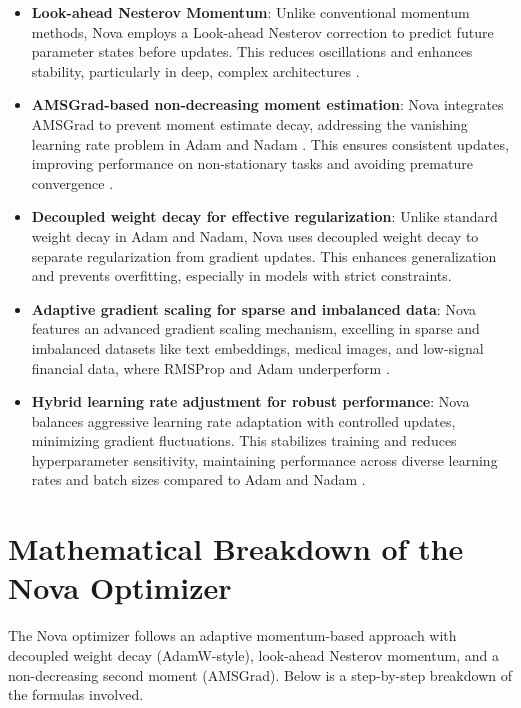 \documentclass{article}
\begin{document}
\begin{itemize}
\item \textbf{Look-ahead Nesterov Momentum}: Unlike conventional momentum methods, Nova employs a Look-ahead Nesterov correction \cite{nesterov1983method, B4} to predict future parameter states before updates. This reduces oscillations and enhances stability, particularly in deep, complex architectures \cite{Goodfellow2016}.

\item \textbf{AMSGrad-based non-decreasing moment estimation}: Nova integrates AMSGrad \cite{Reddi2018} to prevent moment estimate decay, addressing the vanishing learning rate problem in Adam \cite{kingma2014adam} and Nadam \cite{Dozat2016}. This ensures consistent updates, improving performance on non-stationary tasks and avoiding premature convergence \cite{Wilson2017}.

\item \textbf{Decoupled weight decay for effective regularization}: Unlike standard weight decay in Adam and Nadam, Nova uses decoupled weight decay \cite{Loshchilov2017, B1} to separate regularization from gradient updates. This enhances generalization and prevents overfitting, especially in models with strict constraints.

\item \textbf{Adaptive gradient scaling for sparse and imbalanced data}: Nova features an advanced gradient scaling mechanism, excelling in sparse and imbalanced datasets like text embeddings, medical images, and low-signal financial data, where RMSProp and Adam underperform \cite{Duchi2011}.

\item \textbf{Hybrid learning rate adjustment for robust performance}: Nova balances aggressive learning rate adaptation with controlled updates, minimizing gradient fluctuations. This stabilizes training and reduces hyperparameter sensitivity, maintaining performance across diverse learning rates and batch sizes compared to Adam and Nadam \cite{Sivaprasad2019}.
\end{itemize}


\section{ Mathematical Breakdown of the Nova Optimizer}\label{Sec 5}


The Nova optimizer follows an adaptive momentum-based approach with decoupled weight decay (AdamW-style), look-ahead Nesterov momentum, and a non-decreasing second moment (AMSGrad). Below is a step-by-step breakdown of the formulas involved.
\end{document}
